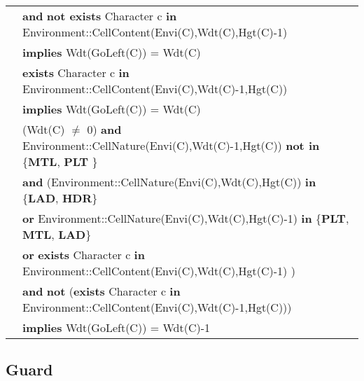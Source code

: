 \documentclass[8pt]{article}
\begin{document}
{\begin{tabular}{rl}
  & \quad\quad \textbf{and} \textbf{not exists} \textrm{Character} c \textbf{in} \textrm{Environment::CellContent(Envi(C),Wdt(C),Hgt(C)-1)} \\
  & \quad\quad \textbf{implies} \textrm{Wdt(GoLeft(C))} = \textrm{Wdt(C)} \\
  & \textbf{exists} \textrm{Character} c \textbf{in} \textrm{Environment::CellContent(Envi(C),Wdt(C)-1,Hgt(C))} \\ & \quad\quad \textbf{implies} \textrm{Wdt(GoLeft(C))} = \textrm{Wdt(C)} \\
  & (\textrm{Wdt(C)} $\neq$ 0) \textbf{and} \textrm{Environment::CellNature(Envi(C),Wdt(C)-1,Hgt(C))} \textbf{not in} \{\textbf{MTL}, \textbf{PLT} \} \\
  & \quad\quad \textbf{and} (\textrm{Environment::CellNature(Envi(C),Wdt(C),Hgt(C))} \textbf{in} \{\textbf{LAD}, \textbf{HDR}\} \\
  & \quad\quad\quad\quad \textbf{or} \textrm{Environment::CellNature(Envi(C),Wdt(C),Hgt(C)-1)} \textbf{in} \{\textbf{PLT}, \textbf{MTL}, \textbf{LAD}\} \\
  & \quad\quad\quad\quad \textbf{or} \textbf{exists} \textrm{Character} c \textbf{in} \textrm{Environment::CellContent(Envi(C),Wdt(C),Hgt(C)-1)} ) \\
  & \quad\quad \textbf{and} \textbf{not} (\textbf{exists} \textrm{Character} c \textbf{in} \textrm{Environment::CellContent(Envi(C),Wdt(C)-1,Hgt(C))}) \\
  & \quad\quad \textbf{implies} \textrm{Wdt(GoLeft(C))} = \textrm{Wdt(C)}-1
\end{tabular}}

\subsection{Guard}
\end{document}
